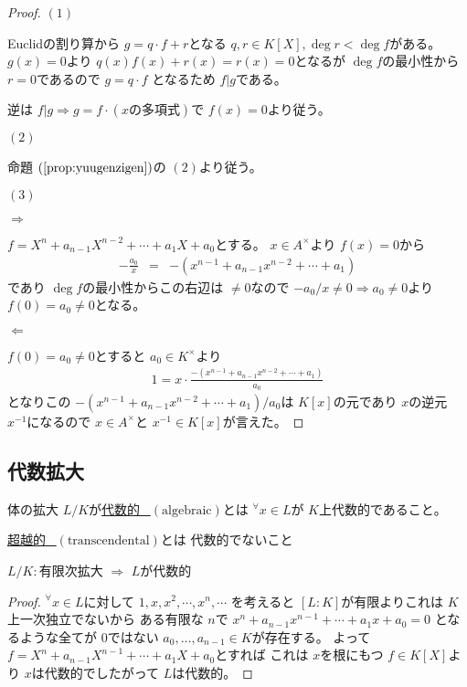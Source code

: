 \documentclass[../master_galois_theory]{subfiles}
\begin{document}
\begin{proof}
  $(1)$

  \rm{Euclid}の割り算から $g = q \cdot f + r$となる
  $q , r \in K[X] , \deg r < \deg f$がある。
  $g(x) = 0$より $q(x)f(x) + r(x) = r(x) = 0$となるが
  $\deg f$の最小性から $r = 0$であるので $g = q \cdot f$
  となるため $f | g$である。

  逆は $f | g \Rightarrow g = f \cdot (xの多項式)$で $f(x) = 0$より従う。

  $(2)$

  命題 $(\mathrm{\ref{prop:yuugenzigen}})$の $(2)$より従う。

  $(3)$

  $\Rightarrow$

  $f = X^n + a_{n-1} X^{n-2} + \cdots + a_1 X + a_0$とする。
  $x \in A^\times$より $f(x) = 0$から
  \begin{eqnarray*}
    - \frac{a_0}{x} & = & -(x^{n-1} + a_{n-1}x^{n-2} + \cdots + a_1)
  \end{eqnarray*}
  であり $\deg f$の最小性からこの右辺は $\neq 0$なので
  $- a_0 / x \neq 0 \Rightarrow a_0 \neq 0$より
  $f(0) = a_0 \neq 0$となる。

  $\Leftarrow$

  $f(0) = a_0 \neq 0$とすると $a_0 \in K^\times$より
  \begin{eqnarray*}
    1 = x \cdot \frac{-(x^{n-1} + a_{n-1} x^{n-2} + \cdots + a_1)}{a_0}
  \end{eqnarray*}
  となりこの $-(x^{n-1} + a_{n-1} x^{n-2} + \cdots + a_1)/a_0$は
  $K[x]$の元であり $x$の逆元 $x^{-1}$になるので $x \in A^\times$と
  $x^{-1} \in K[x]$が言えた。
\end{proof}

\subsection{代数拡大}

\begin{defi}
  体の拡大 $L/K$が\underline{代数的 \  $(\mathrm{algebraic})$}とは
  ${}^\forall x \in L$が $K$上代数的であること。

  \underline{超越的 \  $(\mathrm{transcendental})$}とは
  代数的でないこと
\end{defi}

\begin{rem} \label{rem:6.4}
  $L/K:$有限次拡大 $\Rightarrow$ $L$が代数的
\end{rem}

\begin{proof}
  ${}^\forall x \in L$に対して $1 , x , x^2 , \cdots , x^n , \cdots$
  を考えると $[L:K]$が有限よりこれは $K$上一次独立でないから
  ある有限な $n$で $x^n + a_{n-1}x^{n-1} + \cdots + a_1 x + a_0 = 0$
  となるような全てが $0$ではない $a_0 , \dots , a_{n-1} \in K$が存在する。
  よって $f = X^n + a_{n-1}X^{n-1} + \cdots + a_1 X + a_0$とすれば
  これは $x$を根にもつ $f \in K[X]$より $x$は代数的でしたがって $L$は代数的。
\end{proof}
\end{document}
